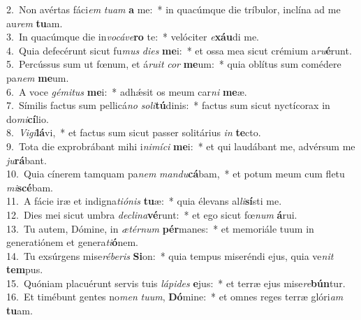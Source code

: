 {2.~}Non avértas fáci\textit{em} \textit{tu}\textit{am} \textbf{a} me:~* in quacúmque die tríbulor, inclína ad me au\textit{rem} \textbf{tu}am.\\
{3.~}In quacúmque die in\textit{vo}\textit{cá}\textit{ve}\textbf{ro} te:~* velóciter \textit{e}\textbf{xáu}di me.\\
{4.~}Quia defecérunt sicut fu\textit{mus} \textit{di}\textit{es} \textbf{me}i:~* et ossa mea sicut crémium a\textit{ru}\textbf{é}runt.\\
{5.~}Percússus sum ut fœnum, et á\textit{ru}\textit{it} \textit{cor} \textbf{me}um:~* quia oblítus sum comédere pa\textit{nem} \textbf{me}um.\\
{6.~}A voce \textit{gé}\textit{mi}\textit{tus} \textbf{me}i:~* adhǽsit os meum car\textit{ni} \textbf{me}æ.\\
{7.~}Símilis factus sum pellicá\textit{no} \textit{so}\textit{li}\textbf{tú}dinis:~* factus sum sicut nyctícorax in do\textit{mi}\textbf{cí}lio.\\
{8.~}\textit{Vi}\textit{gi}\textbf{lá}vi,~* et factus sum sicut passer solitárius \textit{in} \textbf{te}cto.\\
{9.~}Tota die exprobrábant mihi i\textit{ni}\textit{mí}\textit{ci} \textbf{me}i:~* et qui laudábant me, advérsum me \textit{ju}\textbf{rá}bant.\\
{10.~}Quia cínerem tamquam pa\textit{nem} \textit{man}\textit{du}\textbf{cá}bam,~* et potum meum cum fletu \textit{mi}\textbf{scé}bam.\\
{11.~}A fácie iræ et indigna\textit{ti}\textit{ó}\textit{nis} \textbf{tu}æ:~* quia élevans al\textit{li}\textbf{sí}sti me.\\
{12.~}Dies mei sicut umbra \textit{de}\textit{cli}\textit{na}\textbf{vé}runt:~* et ego sicut fœ\textit{num} \textbf{á}rui.\\
{13.~}Tu autem, Dómine, in \textit{æ}\textit{tér}\textit{num} \textbf{pér}manes:~* et memoriále tuum in generatiónem et genera\textit{ti}\textbf{ó}nem.\\
{14.~}Tu exsúrgens mise\textit{ré}\textit{be}\textit{ris} \textbf{Si}on:~* quia tempus miseréndi ejus, quia ve\textit{nit} \textbf{tem}pus.\\
{15.~}Quóniam placuérunt servis tuis \textit{lá}\textit{pi}\textit{des} \textbf{e}jus:~* et terræ ejus mise\textit{re}\textbf{bún}tur.\\
{16.~}Et timébunt gentes no\textit{men} \textit{tu}\textit{um}, \textbf{Dó}mine:~* et omnes reges terræ glóri\textit{am} \textbf{tu}am.\\
